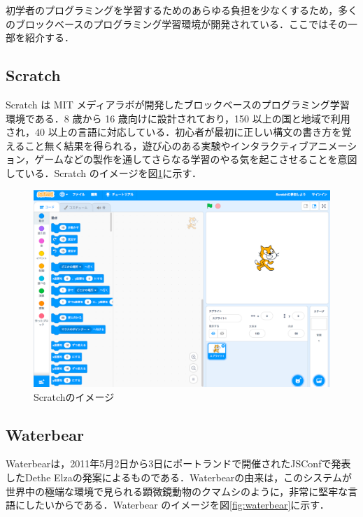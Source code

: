\documentclass{risepaper}
\begin{document}
初学者のプログラミングを学習するためのあらゆる負担を少なくするため，多くのブロックベースのプログラミング学習環境が開発されている．ここではその一部を紹介する．

    \subsection{Scratch}
 
Scratch\cite{Scratch} は MIT メディアラボが開発したブロックベースのプログラミング学習環境である．8 歳から 16 歳向けに設計されており，150 以上の国と地域で利用され，40 以上の言語に対応している．初心者が最初に正しい構文の書き方を覚えること無く結果を得られる，遊び心のある実験やインタラクティブアニメーション，ゲームなどの製作を通してさらなる学習のやる気を起こさせることを意図している．Scratch のイメージを図\ref{fig:scratch}に示す． 

\begin{figure}[h]
\begin{center}
\includegraphics[scale=0.3]{img/scratch.png}
\caption{Scratchのイメージ}%
\label{fig:scratch}
\end{center}%
\end{figure}%

	\subsection{Waterbear}
    
Waterbear\cite{waterbear}は，2011年5月2日から3日にポートランドで開催されたJSConfで発表したDethe Elzaの発案によるものである．Waterbearの由来は，このシステムが世界中の極端な環境で見られる顕微鏡動物のクマムシのように，非常に堅牢な言語にしたいからである．Waterbear のイメージを図\ref{fig:waterbear}に示す． 
\end{document}
